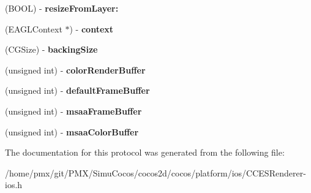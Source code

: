 \begin{DoxyCompactItemize}
\item 
\mbox{\label{protocolCCESRenderer_01-p_ada39987e9f16d2a1d4834932ac286cee}} 
(B\+O\+OL) -\/ {\bfseries resize\+From\+Layer\+:}
\item 
\mbox{\label{protocolCCESRenderer_01-p_a2b165504ea08c67fd30dfb8d66b72e2e}} 
(E\+A\+G\+L\+Context $\ast$) -\/ {\bfseries context}
\item 
\mbox{\label{protocolCCESRenderer_01-p_abb45b5c5b64c90c1a4172fbc6b75d00f}} 
(C\+G\+Size) -\/ {\bfseries backing\+Size}
\item 
\mbox{\label{protocolCCESRenderer_01-p_af78510dbd4c0c5e5cb73623637292849}} 
(unsigned int) -\/ {\bfseries color\+Render\+Buffer}
\item 
\mbox{\label{protocolCCESRenderer_01-p_ababfcd4692d0126c60f546b6a35bc0bd}} 
(unsigned int) -\/ {\bfseries default\+Frame\+Buffer}
\item 
\mbox{\label{protocolCCESRenderer_01-p_a0a4ee5acd4c755e6e23ce323c2b30b09}} 
(unsigned int) -\/ {\bfseries msaa\+Frame\+Buffer}
\item 
\mbox{\label{protocolCCESRenderer_01-p_a47f2985b62353346cca11d9fb3e5024c}} 
(unsigned int) -\/ {\bfseries msaa\+Color\+Buffer}
\end{DoxyCompactItemize}


The documentation for this protocol was generated from the following file\+:\begin{DoxyCompactItemize}
\item 
/home/pmx/git/\+P\+M\+X/\+Simu\+Cocos/cocos2d/cocos/platform/ios/C\+C\+E\+S\+Renderer-\/ios.\+h\end{DoxyCompactItemize}
